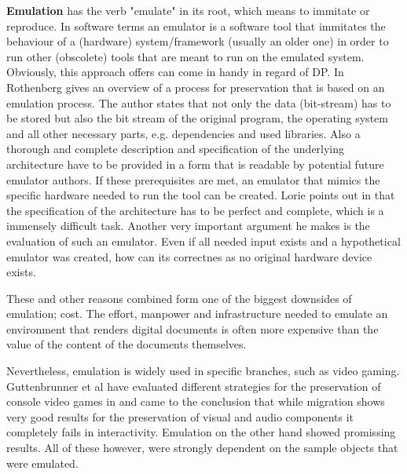 \textbf{Emulation} has the verb "emulate" in its root, which means to immitate or reproduce.
In software terms an emulator is a software tool that immitates the behaviour of a (hardware) system/framework (usually an older one) in order to run other (obscolete) tools that are meant to run on the emulated system. Obviously, this approach offers can come in handy in regard of DP.
In \cite{rothenberg:1999:ensuring} Rothenberg gives an overview of a process for preservation that is based on an emulation process. The author states that not only the data (bit-stream) has to be stored but also the bit stream of the original program, the operating system and all other necessary parts, e.g. dependencies and used libraries. Also a thorough and complete description and specification of the underlying architecture have to be provided in a form that is readable by potential future emulator authors. If these prerequisites are met, an emulator that mimics the specific hardware needed to run the tool can be created.
Lorie points out in \cite{Lorie:2001:LTP:379437.379726} that the specification of the architecture has to be perfect and complete, which is a immensely difficult task. Another very important argument he makes is the evaluation of such an emulator. Even if all needed input exists and a hypothetical emulator was created, how can its correctnes as no original hardware device exists.

These and other reasons combined form one of the biggest downsides of emulation; cost. The effort, manpower and infrastructure needed to emulate an environment that renders digital documents is often more expensive than the value of the content of the documents themselves.

Nevertheless, emulation is widely used in specific branches, such as video gaming.
Guttenbrunner et al have evaluated different strategies for the preservation of console video games in \cite{guttenbrunner:2008:evaluating} and came to the conclusion that while migration shows very good results for the preservation of visual and audio components it completely fails in interactivity. Emulation on the other hand showed promissing results. All of these however, were strongly dependent on the sample objects that were emulated.

